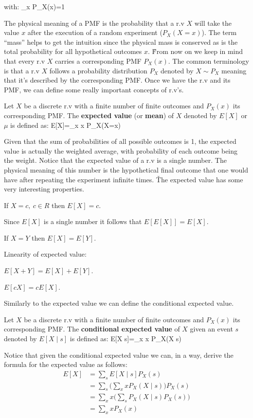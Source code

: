 with:
\bse
\sum_{x} P_{X}(x)=1
\ese
\ed

The physical meaning of a PMF is the probability that a r.v $X$ will take the value $x$ after the execution of a
random experiment ($P_{X}(X=x)$). The term ``mass'' helps to get the intuition since the physical mass is conserved
as is the total probability for all hypothetical outcomes $x$. \v

From now on we keep in mind that every r.v $X$ carries a corresponding PMF $P_{X}(x)$. The common terminology is that
a r.v $X$ follows a probability distribution $P_{X}$ denoted by $X \sim P_{X}$ meaning that it's described by the
corresponding PMF. Once we have the r.v and its PMF, we can define some really important concepts of r.v's.

Let $X$ be a discrete r.v with a finite number of finite outcomes and $P_{X} (x)$ its corresponding PMF. The
\textbf{expected value} (or \textbf{mean}) of $X$ denoted by $E[X]$ or $\mu$ is defined as:
\bse
E[X]=\sum _{x} x \cdot P_{X}(X=x)
\ese
\ed

Given that the sum of probabilities of all possible outcomes is 1, the expected value is actually the weighted
average, with probability of each outcome being the weight. Notice that the expected value of a r.v is a single
number. The physical meaning of this number is the hypothetical final outcome that one would have after repeating the
experiment infinite times. \v

The expected value has some very interesting properties.
\ben
\item If $X=c, \: c \in R$ then $E[X]=c$.
\item Since $E[X]$ is a single number it follows that $E[E[X]]=E[X]$.
\item If $X = Y$ then $E[X] = E[Y]$.
\item Linearity of expected value:
\bit
\item $E[X+Y] = E[X] + E[Y]$.
\item $E[c X] = c E[X]$.
\eit
\een

Similarly to the expected value we can define the conditional expected value.

Let $X$ be a discrete r.v with a finite number of finite outcomes and $P_{X} (x)$ its corresponding PMF. The
\textbf{conditional expected value} of $X$ given an event $s$ denoted by $E[X \mid s]$ is defined as:
\bse
E[X \mid s]=\sum _{x} x P_{X}(X \mid s)
\ese
\ed

Notice that given the conditional expected value we can, in a way, derive the formula for the expected value as follows:
\begin{align*}
E[X] &= \sum_{s} E[X \mid s] P_{X}(s) \\
&= \sum_{s} \Big( \sum_{x} x P_{X}(X \mid s) \Big) P_{X}(s) \\
&= \sum_{x} x \Big( \sum_{s} P_{X}(X \mid s) P_{X}(s) \Big) \\
&= \sum_{x} x P_{X}(x)
\end{align*}

